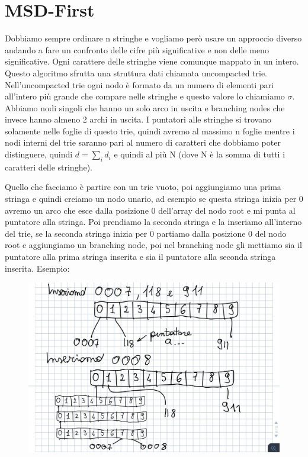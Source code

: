 \documentclass[14pt]{extreport}
\begin{document}
\section{MSD-First}

Dobbiamo sempre ordinare n stringhe e vogliamo però usare un approccio diverso andando a fare un confronto delle cifre più significative e non delle meno significative. Ogni carattere delle stringhe viene comunque mappato in un intero.
Questo algoritmo sfrutta una struttura dati chiamata uncompacted trie.
Nell'uncompacted trie ogni nodo è formato da un numero di elementi pari all'intero più grande che compare nelle stringhe e questo valore lo chiamiamo $\sigma$.
Abbiamo nodi singoli che hanno un solo arco in uscita e branching nodes che invece hanno almeno 2 archi in uscita.
I puntatori alle stringhe si trovano solamente nelle foglie di questo trie, quindi avremo al massimo n foglie mentre i nodi interni del trie saranno pari al numero di caratteri che dobbiamo poter distinguere, quindi $d=\sum_i d_i$ e quindi al più N (dove N è la somma di tutti i caratteri delle stringhe).

Quello che facciamo è partire con un trie vuoto, poi aggiungiamo una prima stringa e quindi creiamo un nodo unario, ad esempio se questa stringa inizia per 0 avremo un arco che esce dalla posizione 0 dell'array del nodo root e mi punta al puntatore alla stringa.
Poi prendiamo la seconda stringa e la inseriamo all'interno del trie, se la seconda stringa inizia per 0 partiamo dalla posizione 0 del nodo root e aggiungiamo un branching node, poi nel branching node gli mettiamo sia il puntatore alla prima stringa inserita e sia il puntatore alla seconda stringa inserita.
Esempio:

\begin{figure}[h!]
\centering
  \includegraphics[width=\linewidth]{Trie.jpg}
\end{figure}
\end{document}
